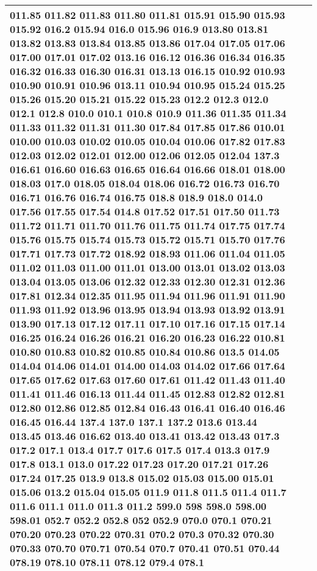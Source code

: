 \begin{longtable}{|L{.1in}|L{.6in}||L{5.65in}|}
011.85 011.82 011.83 011.80 011.81 015.91 015.90 015.93 015.92 016.2 015.94 016.0 015.96 016.9 013.80 013.81 013.82 013.83 013.84 013.85 013.86 017.04 017.05 017.06 017.00 017.01 017.02 013.16 016.12 016.36 016.34 016.35 016.32 016.33 016.30 016.31 013.13 016.15 010.92 010.93 010.90 010.91 010.96 013.11 010.94 010.95 015.24 015.25 015.26 015.20 015.21 015.22 015.23 012.2 012.3 012.0 012.1 012.8 010.0 010.1 010.8 010.9 011.36 011.35 011.34 011.33 011.32 011.31 011.30 017.84 017.85 017.86 010.01 010.00 010.03 010.02 010.05 010.04 010.06 017.82 017.83 012.03 012.02 012.01 012.00 012.06 012.05 012.04 137.3 016.61 016.60 016.63 016.65 016.64 016.66 018.01 018.00 018.03 017.0 018.05 018.04 018.06 016.72 016.73 016.70 016.71 016.76 016.74 016.75 018.8 018.9 018.0 014.0 017.56 017.55 017.54 014.8 017.52 017.51 017.50 011.73 011.72 011.71 011.70 011.76 011.75 011.74 017.75 017.74 015.76 015.75 015.74 015.73 015.72 015.71 015.70 017.76 017.71 017.73 017.72 018.92 018.93 011.06 011.04 011.05 011.02 011.03 011.00 011.01 013.00 013.01 013.02 013.03 013.04 013.05 013.06 012.32 012.33 012.30 012.31 012.36 017.81 012.34 012.35 011.95 011.94 011.96 011.91 011.90 011.93 011.92 013.96 013.95 013.94 013.93 013.92 013.91 013.90 017.13 017.12 017.11 017.10 017.16 017.15 017.14 016.25 016.24 016.26 016.21 016.20 016.23 016.22 010.81 010.80 010.83 010.82 010.85 010.84 010.86 013.5 014.05 014.04 014.06 014.01 014.00 014.03 014.02 017.66 017.64 017.65 017.62 017.63 017.60 017.61 011.42 011.43 011.40 011.41 011.46 016.13 011.44 011.45 012.83 012.82 012.81 012.80 012.86 012.85 012.84 016.43 016.41 016.40 016.46 016.45 016.44 137.4 137.0 137.1 137.2 013.6 013.44 013.45 013.46 016.62 013.40 013.41 013.42 013.43 017.3 017.2 017.1 013.4 017.7 017.6 017.5 017.4 013.3 017.9 017.8 013.1 013.0 017.22 017.23 017.20 017.21 017.26 017.24 017.25 013.9 013.8 015.02 015.03 015.00 015.01 015.06 013.2 015.04 015.05 011.9 011.8 011.5 011.4 011.7 011.6 011.1 011.0 011.3 011.2 599.0 598 598.0 598.00 598.01 052.7 052.2 052.8 052 052.9 070.0 070.1 070.21 070.20 070.23 070.22 070.31 070.2 070.3 070.32 070.30 070.33 070.70 070.71 070.54 070.7 070.41 070.51 070.44 078.19 078.10 078.11 078.12 079.4 078.1
  \\\hline

\end{longtable}
